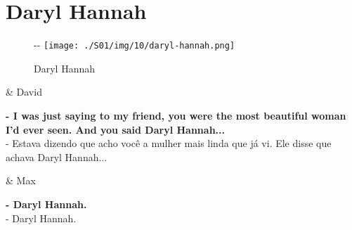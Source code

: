 \hypertarget{daryl-hannah}{%
\section{Daryl Hannah}\label{daryl-hannah}}

\begin{figure}[!ht]
  \begin{adjustwidth}{-\oddsidemargin-1in}{-\rightmargin}
    \centering
    \texttt{[image: ./S01/img/10/daryl-hannah.png]}
    \caption{Daryl Hannah\label{fig:daryl-hannah}}
  \end{adjustwidth}
\end{figure}

\begin{tcolorbox}[enhanced,center upper,
    drop fuzzy shadow southeast, boxrule=0.3pt,
    lower separated=false,
    colframe=black!30!dialogoBorder,colback=white]
\begin{minipage}[c]{0.16\linewidth}
   & \centering \scriptsize{David}
\end{minipage}
\hfill
\begin{minipage}[c]{0.8\linewidth}
  \textbf{- I was just saying to my friend, you were the most beautiful woman I'd ever seen. And you said Daryl Hannah...}\\
  - Estava dizendo que acho você a mulher mais linda que já vi. Ele disse que achava Daryl Hannah...
\end{minipage}

\medskip
\begin{minipage}[c]{0.16\linewidth}
   & \centering \scriptsize{Max}
\end{minipage}
\hfill
\begin{minipage}[c]{0.8\linewidth}
  \textbf{- Daryl Hannah.}\\
  - Daryl Hannah.
\end{minipage}
\end{tcolorbox}

